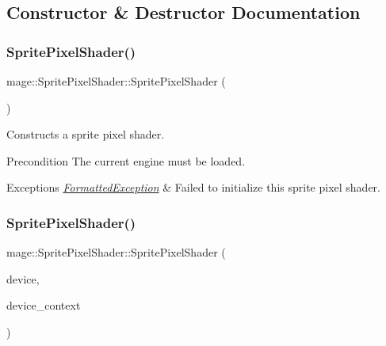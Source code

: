 \subsection{Constructor \& Destructor Documentation}
\hypertarget{classmage_1_1_sprite_pixel_shader_a27c14557bf08f15d321c5dd728b3343d}{}\label{classmage_1_1_sprite_pixel_shader_a27c14557bf08f15d321c5dd728b3343d} 
\subsubsection{\texorpdfstring{Sprite\+Pixel\+Shader()}{SpritePixelShader()}\hspace{0.1cm}{\footnotesize\ttfamily [1/4]}}
{\footnotesize\ttfamily mage\+::\+Sprite\+Pixel\+Shader\+::\+Sprite\+Pixel\+Shader (\begin{DoxyParamCaption}{ }\end{DoxyParamCaption})}

Constructs a sprite pixel shader.

\begin{DoxyPrecond}{Precondition}
The current engine must be loaded. 
\end{DoxyPrecond}

\begin{DoxyExceptions}{Exceptions}
{\em \hyperlink{structmage_1_1_formatted_exception}{Formatted\+Exception}} & Failed to initialize this sprite pixel shader. \\
\hline
\end{DoxyExceptions}
\hypertarget{classmage_1_1_sprite_pixel_shader_abffbb811fa7b34e538748ae5d082aec4}{}\label{classmage_1_1_sprite_pixel_shader_abffbb811fa7b34e538748ae5d082aec4} 
\subsubsection{\texorpdfstring{Sprite\+Pixel\+Shader()}{SpritePixelShader()}\hspace{0.1cm}{\footnotesize\ttfamily [2/4]}}
{\footnotesize\ttfamily mage\+::\+Sprite\+Pixel\+Shader\+::\+Sprite\+Pixel\+Shader (\begin{DoxyParamCaption}\item[{I\+D3\+D11\+Device2 $\ast$}]{device,  }\item[{I\+D3\+D11\+Device\+Context2 $\ast$}]{device\+\_\+context }\end{DoxyParamCaption})\hspace{0.3cm}{\ttfamily [explicit]}}

